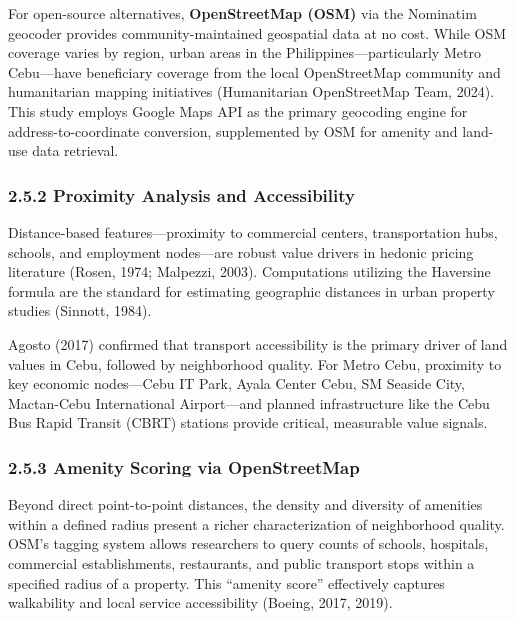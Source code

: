 For open-source alternatives, \textbf{OpenStreetMap (OSM)} via the Nominatim geocoder provides community-maintained geospatial data at no cost. While OSM coverage varies by region, urban areas in the Philippines---particularly Metro Cebu---have beneficiary coverage from the local OpenStreetMap community and humanitarian mapping initiatives (Humanitarian OpenStreetMap Team, 2024). This study employs Google Maps API as the primary geocoding engine for address-to-coordinate conversion, supplemented by OSM for amenity and land-use data retrieval.

\subsubsection{\texorpdfstring{\textbf{2.5.2 Proximity Analysis and Accessibility}}{2.5.2 Proximity Analysis and Accessibility}}\label{proximity-analysis-and-accessibility}

Distance-based features---proximity to commercial centers, transportation hubs, schools, and employment nodes---are robust value drivers in hedonic pricing literature (Rosen, 1974; Malpezzi, 2003). Computations utilizing the Haversine formula are the standard for estimating geographic distances in urban property studies (Sinnott, 1984).

Agosto (2017) confirmed that transport accessibility is the primary driver of land values in Cebu, followed by neighborhood quality. For Metro Cebu, proximity to key economic nodes---Cebu IT Park, Ayala Center Cebu, SM Seaside City, Mactan-Cebu International Airport---and planned infrastructure like the Cebu Bus Rapid Transit (CBRT) stations provide critical, measurable value signals.

\subsubsection{\texorpdfstring{\textbf{2.5.3 Amenity Scoring via OpenStreetMap}}{2.5.3 Amenity Scoring via OpenStreetMap}}\label{amenity-scoring-via-openstreetmap}

Beyond direct point-to-point distances, the density and diversity of amenities within a defined radius present a richer characterization of neighborhood quality. OSM's tagging system allows researchers to query counts of schools, hospitals, commercial establishments, restaurants, and public transport stops within a specified radius of a property. This ``amenity score'' effectively captures walkability and local service accessibility (Boeing, 2017, 2019).

